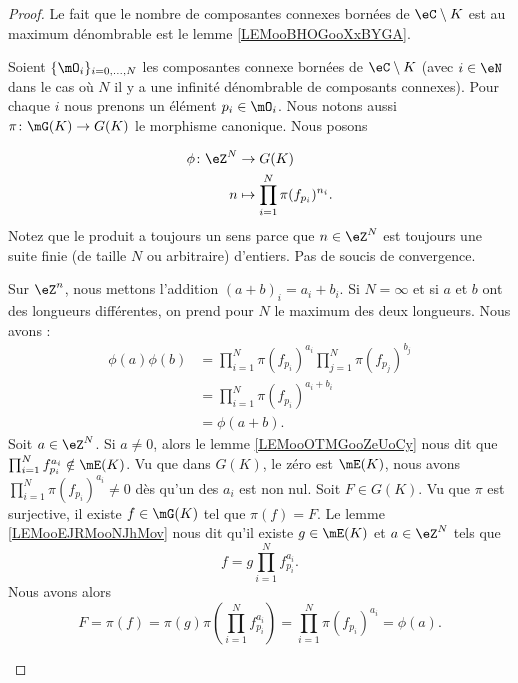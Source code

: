 \begin{proof}

	Le fait que le nombre de composantes connexes bornées de \( \eC\setminus K\) est au maximum dénombrable est le lemme \ref{LEMooBHOGooXxBYGA}.

	Soient \( \{ \mO_i \}_{i=0,\ldots,N}\) les composantes connexe bornées de \( \eC\setminus K\) (avec \( i\in \eN\) dans le cas où \( N\) il y a une infinité dénombrable de composants connexes). Pour chaque \( i\) nous prenons un élément \( p_i\in\mO_i\). Nous notons aussi \(\pi \colon \mG(K)\to G(K)  \) le morphisme canonique. Nous posons

	\begin{equation}
		\begin{aligned}
			\phi\colon \eZ^N & \to G(K)                                 \\
			n                & \mapsto \prod_{i=1}^N\pi(f_{p_i})^{n_i}.
		\end{aligned}
	\end{equation}
	Notez que le produit a toujours un sens parce que \( n\in \eZ^N\) est toujours une suite finie (de taille \( N\) ou arbitraire) d'entiers. Pas de soucis de convergence.
	\begin{subproof}
		Sur \( \eZ^n\), nous mettons l'addition \( (a+b)_i=a_i+b_i\). Si \( N=\infty\) et si \( a\) et \(b\) ont des longueurs différentes, on prend pour \( N\) le maximum des deux longueurs. Nous avons :
		\begin{subequations}
			\begin{align}
				\phi(a)\phi(b) & =\prod_{i=1}^N\pi(f_{p_i})^{a_i}\prod_{j=1}^N\pi(f_{p_j})^{b_j} \\
				               & =\prod_{i=1}^N\pi(f_{p_i})^{a_i+b_i}                            \\
				               & =\phi(a+b).
			\end{align}
		\end{subequations}
		Soit \( a\in \eZ^N\). Si \( a\neq 0\), alors le lemme \ref{LEMooOTMGooZeUoCy} nous dit que \( \prod_{i=1}^Nf_{p_i}^{a_i}\notin\mE(K)\). Vu que dans \( G(K)\), le zéro est \( \mE(K)\), nous avons \( \prod_{i=1}^N\pi(f_{p_i})^{a_i}\neq 0\) dès qu'un des \( a_i\) est non nul.
		Soit \( F\in G(K)\). Vu que \( \pi\) est surjective, il existe \( f\in \mG(K)\) tel que \( \pi(f)=F\). Le lemme \ref{LEMooEJRMooNJhMov} nous dit qu'il existe \( g\in\mE(K) \) et \( a\in \eZ^N\) tels que
		\begin{equation}
			f=g\prod_{i=1}^Nf_{p_i}^{a_i}.
		\end{equation}
		Nous avons alors
		\begin{equation}
			F=\pi(f)=\pi(g)\pi\left(  \prod_{i=1}^Nf_{p_i}^{a_i} \right)=\prod_{i=1}^N\pi(f_{p_i})^{a_i}=\phi(a).
		\end{equation}
	\end{subproof}
\end{proof}

